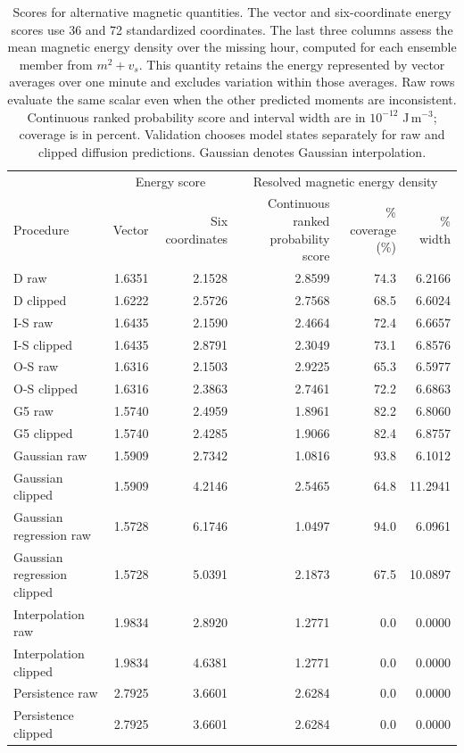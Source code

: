 \documentclass{article}
\begin{document}
\begin{table}[ht]
\centering
\caption{Scores for alternative magnetic quantities. The vector and six-coordinate energy scores use 36 and 72 standardized coordinates. The last three columns assess the mean magnetic energy density over the missing hour, computed for each ensemble member from $m^2+v_s$. This quantity retains the energy represented by vector averages over one minute and excludes variation within those averages. Raw rows evaluate the same scalar even when the other predicted moments are inconsistent. Continuous ranked probability score and interval width are in $10^{-12}$ J\,m$^{-3}$; coverage is in percent. Validation chooses model states separately for raw and clipped diffusion predictions. Gaussian denotes Gaussian interpolation.}
\label{tab:alternative}
\setlength{\tabcolsep}{3.5pt}
\begin{tabular}{@{}lrrrrr@{}}
\toprule
 & \multicolumn{2}{c}{Energy score} & \multicolumn{3}{c}{Resolved magnetic energy density} \\
Procedure & Vector & \parbox[c]{17mm}{\centering Six coordinates} & \parbox[c]{27mm}{\centering Continuous ranked probability score} & \parbox[c]{19mm}{\% coverage (\%)} & \parbox[c]{14mm}{\% width} \\
\midrule
D raw & 1.6351 & 2.1528 & 2.8599 & 74.3 & 6.2166 \\
D clipped & 1.6222 & 2.5726 & 2.7568 & 68.5 & 6.6024 \\
I-S raw & 1.6435 & 2.1590 & 2.4664 & 72.4 & 6.6657 \\
I-S clipped & 1.6435 & 2.8791 & 2.3049 & 73.1 & 6.8576 \\
O-S raw & 1.6316 & 2.1503 & 2.9225 & 65.3 & 6.5977 \\
O-S clipped & 1.6316 & 2.3863 & 2.7461 & 72.2 & 6.6863 \\
G5 raw & 1.5740 & 2.4959 & 1.8961 & 82.2 & 6.8060 \\
G5 clipped & 1.5740 & 2.4285 & 1.9066 & 82.4 & 6.8757 \\
Gaussian raw & 1.5909 & 2.7342 & 1.0816 & 93.8 & 6.1012 \\
Gaussian clipped & 1.5909 & 4.2146 & 2.5465 & 64.8 & 11.2941 \\
Gaussian regression raw & 1.5728 & 6.1746 & 1.0497 & 94.0 & 6.0961 \\
Gaussian regression clipped & 1.5728 & 5.0391 & 2.1873 & 67.5 & 10.0897 \\
Interpolation raw & 1.9834 & 2.8920 & 1.2771 & 0.0 & 0.0000 \\
Interpolation clipped & 1.9834 & 4.6381 & 1.2771 & 0.0 & 0.0000 \\
Persistence raw & 2.7925 & 3.6601 & 2.6284 & 0.0 & 0.0000 \\
Persistence clipped & 2.7925 & 3.6601 & 2.6284 & 0.0 & 0.0000 \\
\bottomrule
\end{tabular}
\end{table}
\end{document}
